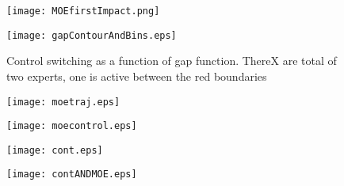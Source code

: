\begin{figure}[H]
    \centering
    \texttt{[image: MOEfirstImpact.png]}
    \label{fig:cartpole}
\end{figure}

\begin{figure}[H]
    \centering
    \texttt{[image: gapContourAndBins.eps]}
    \caption{Control switching as a function of gap function. ThereX are total of two experts, one is active between the red boundaries}
    \label{fig:gapContour}
\end{figure}

\begin{figure}[H]
    \centering
    \texttt{[image: moetraj.eps]}
    \caption{}
    \label{fig:cartpole_trajectory}
\end{figure}
\begin{figure}[H]
    \centering
    \texttt{[image: moecontrol.eps]}
    \caption{}
    \label{fig:cartpole_control}
\end{figure}

\begin{figure}[H]
    \centering
    \texttt{[image: cont.eps]}
    \label{fig:continuous_control}
\end{figure}

\begin{figure}[H]
    \centering
    \texttt{[image: contANDMOE.eps]}
    \label{fig:contandmoe}
\end{figure}
